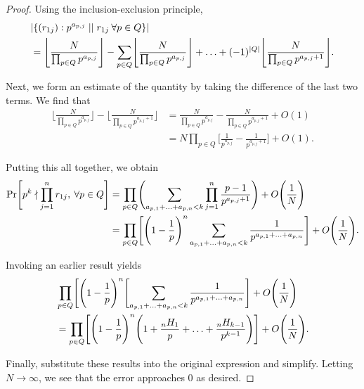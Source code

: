 \documentclass[12pt]{amsart}
\theoremstyle{definition}
\begin{document}
\begin{proof}
	Using the inclusion-exclusion principle, 
	\begin{align*}
		&|\{(r_{1j}): p^{a_{{p,j}}}\mid\mid r_{1j} \: \forall p\in Q\}|\\ &= \Biggl\lfloor\frac{N}{\prod_{p\in Q}p^{a_{p,j}}}\Biggr\rfloor-\sum_{p\in Q}\Biggl\lfloor \frac{N}{\prod_{p\in Q}p^{a_{p,j}}}\Biggr\rfloor+\mathellipsis+(-1)^{|Q|}\Biggl\lfloor\frac{N}{\prod_{p\in Q}p^{a_{p,j}+1}}\Biggr\rfloor.
	\end{align*}
	
	Next, we form an estimate of the quantity by taking the difference of the last two terms. We find that
	\begin{align*}
		\Biggl\lfloor \frac{N}{\prod_{p\in Q} p^{a_{p,j}}} \Biggr\rfloor - \Biggl\lfloor \frac{N}{\prod_{p\in Q} p^{a_{p,j}+1}} \Biggr\rfloor &=
		\frac{N}{\prod_{p\in Q} p^{a_{p,j}}} -  \frac{N}{\prod_{p\in Q} p^{a_{p,j}+1}} + O(1)\\&=
		N\prod_ {p\in Q}\Biggl[ \frac{1}{ p^{a_{p,j}}}  -  \frac{1}{ p^{a_{p,j}+1}} \Biggr]+ O(1).
	\end{align*}
	
	Putting this all together, we obtain
	\begin{align*}
	\Pr\Biggl[p^k\nmid \prod_{j=1}^{n}r_{1j},\: \forall p\in Q\Biggr] &= \prod_{p\in Q} \Biggl(\sum_{a_{p,1}+\mathellipsis+a_{p,n}<k}\prod_{j=1}^{n}\frac{p-1}{p^{a_{p,j}+1}}\Biggr)+O\Biggl(\frac{1}{N}\Biggr)\\
		&=\prod_{p\in Q}\Biggl[\Biggl(1-\frac{1}{p}\Biggr)^n\sum_{a_{p,1}+\mathellipsis+a_{p,n}<k}\frac{1}{p^{a_{p,1}+\mathellipsis+a_{p,n}}}\Biggr]+O\Biggl(\frac{1}{N}\Biggr).
	\end{align*}
	
	Invoking an earlier result yields
	\begin{align*}
		&\prod_{p\in Q}\Biggl[\Biggl(1-\frac{1}{p}\Biggr)^n\Biggl[\sum_{a_{p,1}+\mathellipsis+a_{p,n}<k}\frac{1}{p^{a_{p,1}+\mathellipsis+a_{p,n}}}\Biggr]+O\Biggl(\frac{1}{N}\Biggr)\\
		&= \prod_{p\in Q}\Biggl[\Biggl(1-\frac{1}{p}\Biggr)^n\Biggl(1+\frac{_nH_1}{p}+\mathellipsis+\frac{_nH_{k-1}}{p^{k-1}}\Biggr)\Biggr]+O\Biggl(\frac{1}{N}\Biggr).
	\end{align*}
	
	Finally, substitute these results into the original expression and simplify. Letting $N\to \infty$, we see that the error approaches 0 as desired.
\end{proof}


\newpage
\end{document}
